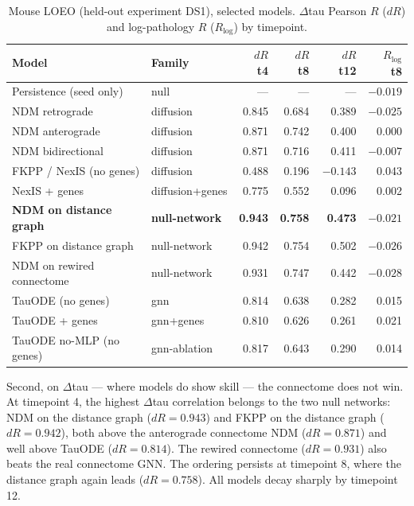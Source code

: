 \documentclass{article}
\begin{document}
\begin{table}[t]
  \caption{Mouse LOEO (held-out experiment DS1), selected models. $\Delta$tau Pearson $R$ ($dR$) and log-pathology $R$ ($R_{\log}$) by timepoint.}
  \label{tab:mouse}
  \centering
  \begin{tabular}{llrrrr}
    \toprule
    Model & Family & $dR$ t4 & $dR$ t8 & $dR$ t12 & $R_{\log}$ t8 \\
    \midrule
    Persistence (seed only)   & null            & ---   & ---   & ---    & $-0.019$ \\
    NDM retrograde            & diffusion       & 0.845 & 0.684 & 0.389  & $-0.025$ \\
    NDM anterograde           & diffusion       & 0.871 & 0.742 & 0.400  & 0.000 \\
    NDM bidirectional         & diffusion       & 0.871 & 0.716 & 0.411  & $-0.007$ \\
    FKPP / NexIS (no genes)   & diffusion       & 0.488 & 0.196 & $-0.143$ & 0.043 \\
    NexIS + genes             & diffusion+genes & 0.775 & 0.552 & 0.096  & 0.002 \\
    \textbf{NDM on distance graph} & \textbf{null-network} & \textbf{0.943} & \textbf{0.758} & \textbf{0.473} & $-0.021$ \\
    FKPP on distance graph    & null-network    & 0.942 & 0.754 & 0.502  & $-0.026$ \\
    NDM on rewired connectome & null-network    & 0.931 & 0.747 & 0.442  & $-0.028$ \\
    TauODE (no genes)         & gnn             & 0.814 & 0.638 & 0.282  & 0.015 \\
    TauODE + genes            & gnn+genes       & 0.810 & 0.626 & 0.261  & 0.021 \\
    TauODE no-MLP (no genes)  & gnn-ablation    & 0.817 & 0.643 & 0.290  & 0.014 \\
    \bottomrule
  \end{tabular}
\end{table}

Second, on $\Delta$tau --- where models do show skill --- the connectome does not win. At timepoint 4, the highest $\Delta$tau correlation belongs to the two null networks: NDM on the distance graph ($dR = 0.943$) and FKPP on the distance graph ($dR = 0.942$), both above the anterograde connectome NDM ($dR = 0.871$) and well above TauODE ($dR = 0.814$). The rewired connectome ($dR = 0.931$) also beats the real connectome GNN. The ordering persists at timepoint 8, where the distance graph again leads ($dR = 0.758$). All models decay sharply by timepoint 12.
\end{document}

